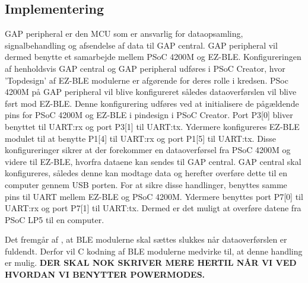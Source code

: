\subsection{Implementering}
GAP peripheral er den MCU som er ansvarlig for dataopsamling, signalbehandling og afsendelse af data til GAP central. GAP peripheral vil dermed benytte et samarbejde mellem PSoC 4200M og EZ-BLE. Konfigureringen af henholdsvis GAP central og GAP peripheral udføres i PSoC Creator, hvor ’Topdesign’ af EZ-BLE modulerne er afgørende for deres rolle i kredsen. \newline
PSoc 4200M på GAP peripheral vil blive konfigureret således dataoverførslen vil blive ført mod EZ-BLE. Denne konfigurering udføres ved at initialisere de pågældende pins for PSoC 4200M og EZ-BLE i pindesign i PSoC Creator. Port P3[0] bliver benyttet til UART:rx og port P3[1] til UART:tx. Ydermere konfigureres EZ-BLE modulet til at benytte P1[4] til UART:rx og port P1[5] til UART:tx. Disse konfigureringer sikrer at der forekommer en dataoverførsel fra PSoC 4200M og videre til EZ-BLE, hvorfra dataene kan sendes til GAP central. \citep{Semiconductor20164200M} \newline
GAP central skal konfigureres, således denne kan modtage data og herefter overføre dette til en computer gennem USB porten. For at sikre disse handlinger, benyttes samme pins til UART mellem EZ-BLE og PSoC 4200M. Ydermere benyttes port P7[0] til UART:rx og port P7[1] til UART:tx. Dermed er det muligt at overføre datene fra PSoC LP5 til en computer. 

Det fremgår af , at BLE modulerne skal sættes slukkes når dataoverførslen er fuldendt. Derfor vil C kodning af BLE modulerne medvirke til, at denne handling er mulig. \textbf{DER SKAL NOK SKRIVER MERE HERTIL NÅR VI VED HVORDAN VI BENYTTER POWERMODES.}

